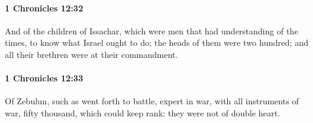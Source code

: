 		\paragraph{1 Chronicles 12:32} %
			\label{1CHRONICLES-12-32}

			And of the children of Issachar, which were men that had understanding of the times, to know what Israel ought to do; the heads of them were two hundred; and all their brethren were at their commandment.


		\paragraph{1 Chronicles 12:33} %
			\label{1CHRONICLES-12-33}

			Of Zebulun, such as went forth to battle, expert in war, with all instruments of war, fifty thousand, which could keep rank: they were not of double heart.

